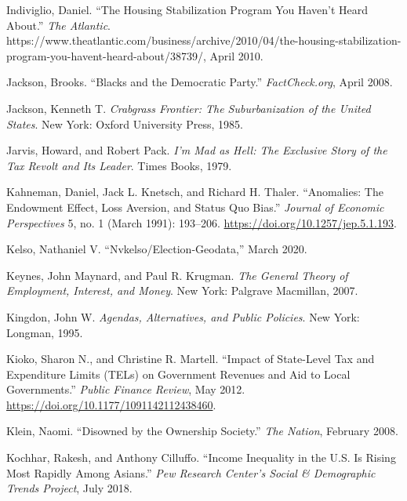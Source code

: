 \documentclass[12pt,oneside]{psthesis}
\begin{document}
\leavevmode\hypertarget{ref-indiviglio2010housing}{}%
Indiviglio, Daniel. ``The Housing Stabilization Program You Haven't Heard About.'' \emph{The Atlantic}. https://www.theatlantic.com/business/archive/2010/04/the-housing-stabilization-program-you-havent-heard-about/38739/, April 2010.

\leavevmode\hypertarget{ref-jackson2008blacks}{}%
Jackson, Brooks. ``Blacks and the Democratic Party.'' \emph{FactCheck.org}, April 2008.

\leavevmode\hypertarget{ref-jacksonCrabgrassFrontierSuburbanization1985}{}%
Jackson, Kenneth T. \emph{Crabgrass Frontier: The Suburbanization of the United States}. New York: Oxford University Press, 1985.

\leavevmode\hypertarget{ref-jarvis1979mad}{}%
Jarvis, Howard, and Robert Pack. \emph{I'm Mad as Hell: The Exclusive Story of the Tax Revolt and Its Leader}. Times Books, 1979.

\leavevmode\hypertarget{ref-kahneman1991anomalies}{}%
Kahneman, Daniel, Jack L. Knetsch, and Richard H. Thaler. ``Anomalies: The Endowment Effect, Loss Aversion, and Status Quo Bias.'' \emph{Journal of Economic Perspectives} 5, no. 1 (March 1991): 193--206. \url{https://doi.org/10.1257/jep.5.1.193}.

\leavevmode\hypertarget{ref-kelso2020nvkelso}{}%
Kelso, Nathaniel V. ``Nvkelso/Election-Geodata,'' March 2020.

\leavevmode\hypertarget{ref-keynes2007general}{}%
Keynes, John Maynard, and Paul R. Krugman. \emph{The General Theory of Employment, Interest, and Money}. New York: Palgrave Macmillan, 2007.

\leavevmode\hypertarget{ref-kingdon1995agendas}{}%
Kingdon, John W. \emph{Agendas, Alternatives, and Public Policies}. New York: Longman, 1995.

\leavevmode\hypertarget{ref-kioko2012impact}{}%
Kioko, Sharon N., and Christine R. Martell. ``Impact of State-Level Tax and Expenditure Limits (TELs) on Government Revenues and Aid to Local Governments.'' \emph{Public Finance Review}, May 2012. \url{https://doi.org/10.1177/1091142112438460}.

\leavevmode\hypertarget{ref-klein2008disowned}{}%
Klein, Naomi. ``Disowned by the Ownership Society.'' \emph{The Nation}, February 2008.

\leavevmode\hypertarget{ref-kochhar2018income}{}%
Kochhar, Rakesh, and Anthony Cilluffo. ``Income Inequality in the U.S. Is Rising Most Rapidly Among Asians.'' \emph{Pew Research Center's Social \& Demographic Trends Project}, July 2018.
\end{document}
